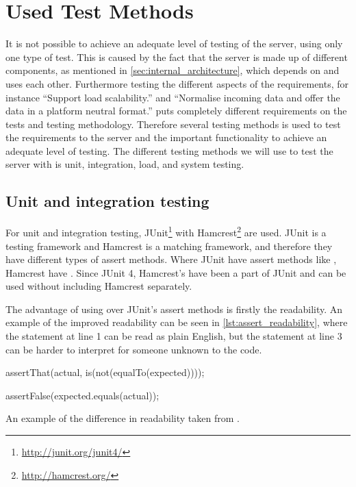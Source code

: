 \section{Used Test Methods}
It is not possible to achieve an adequate level of testing of the server, using only one type of test.
This is caused by the fact that the server is made up of different components,
as mentioned in \cref{sec:internal_architecture},
which depends on and uses each other.
Furthermore testing the different aspects of the requirements, for instance ``Support load scalability.''
and ``Normalise incoming data and offer the data in a platform neutral format.'' puts completely different
requirements on the tests and testing methodology.
Therefore several testing methods is used to test the requirements to the server
and the important functionality to achieve an adequate level of testing.
The different testing methods we will use to test the server with is unit, integration, load, and system testing.

\subsection{Unit and integration testing}
For unit and integration testing, JUnit\footnote{\url{http://junit.org/junit4/}} with Hamcrest\footnote{\url{http://hamcrest.org/}} are used.
JUnit is a testing framework and Hamcrest is a matching framework, and therefore they have different types of assert methods.
Where JUnit have assert methods like , Hamcrest have .
Since JUnit 4, Hamcrest's  have been a part of JUnit and can be used without including Hamcrest separately\cite{hamcrest_vs_junit}.

The advantage of using  over JUnit's assert methods is firstly the readability.
An example of the improved readability can be seen in \cref{lst:assert_readability},
where the  statement at line 1 can be read as plain English,
but the  statement at line 3 can be harder to interpret for someone unknown to the code\cite{hamcrest_vs_junit}.

\begin{listing}
    \begin{java2}
        assertThat(actual, is(not(equalTo(expected))));

        assertFalse(expected.equals(actual));
    \end{java2}
    \caption{An example of the difference in readability taken from \cite{hamcrest_vs_junit}.}
    \label{lst:assert_readability}
\end{listing}

